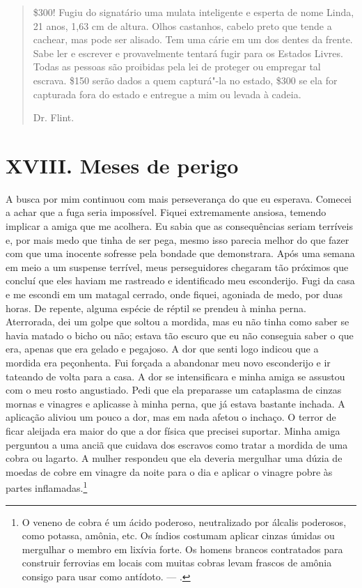 \begin{quote}
 \$300! Fugiu do signatário
uma mulata inteligente e esperta de nome Linda, 21 anos, 1,63 cm de
altura. Olhos castanhos, cabelo preto que tende a cachear, mas pode ser
alisado. Tem uma cárie em um dos dentes da frente. Sabe ler e escrever e
provavelmente tentará fugir para os Estados Livres. Todas as pessoas são
proibidas pela lei de proteger ou empregar tal escrava. \$150 serão
dados a quem capturá"-la no estado, \$300 se ela for capturada fora do
estado e entregue a mim ou levada à cadeia.

Dr. Flint.
\end{quote}

\chapter{XVIII. Meses de perigo}

A busca por mim continuou com mais
perseverança do que eu esperava. Comecei a achar que a fuga seria
impossível. Fiquei extremamente ansiosa, temendo implicar a amiga que me
acolhera. Eu sabia que as consequências seriam terríveis e, por mais
medo que tinha de ser pega, mesmo isso parecia melhor do que fazer com
que uma inocente sofresse pela bondade que demonstrara. Após uma semana
em meio a um suspense terrível, meus perseguidores chegaram tão próximos
que concluí que eles haviam me rastreado e identificado meu esconderijo.
Fugi da casa e me escondi em um matagal cerrado, onde fiquei, agoniada
de medo, por duas horas. De repente, alguma espécie de réptil se prendeu
à minha perna. Aterrorada, dei um golpe que soltou a mordida, mas eu não
tinha como saber se havia matado o bicho ou não; estava tão escuro que
eu não conseguia saber o que era, apenas que era gelado e pegajoso. A
dor que senti logo indicou que a mordida era peçonhenta. Fui forçada a
abandonar meu novo esconderijo e ir tateando de volta para a casa. A dor
se intensificara e minha amiga se assustou com o meu rosto angustiado.
Pedi que ela preparasse um cataplasma de cinzas mornas e vinagres e
aplicasse à minha perna, que já estava bastante inchada. A aplicação
aliviou um pouco a dor, mas em nada afetou o inchaço. O terror de ficar
aleijada era maior do que a dor física que precisei suportar. Minha
amiga perguntou a uma anciã que cuidava dos escravos como tratar a
mordida de uma cobra ou lagarto. A mulher respondeu que ela deveria
mergulhar uma dúzia de moedas de cobre em vinagre da noite para o dia e
aplicar o vinagre pobre às partes inflamadas.\footnote{O veneno de cobra
é um ácido poderoso, neutralizado por álcalis poderosos, como potassa,
amônia, etc. Os índios costumam aplicar cinzas úmidas ou mergulhar o
membro em lixívia forte. Os homens brancos contratados para construir
ferrovias em locais com muitas cobras levam frascos de amônia consigo
para usar como antídoto. --- .}

